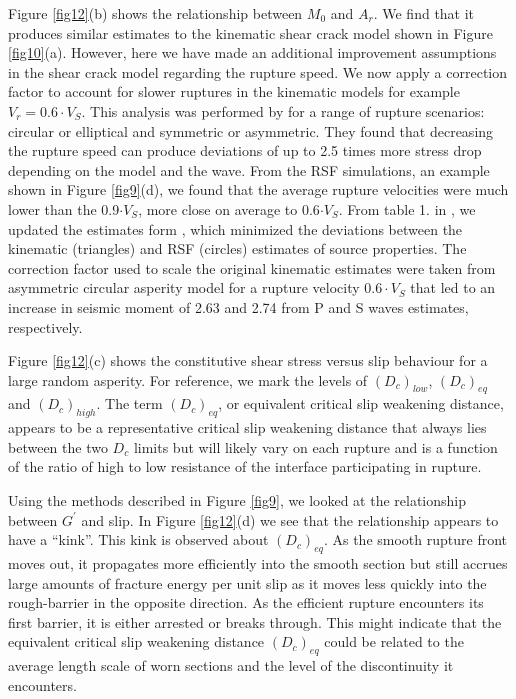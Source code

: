 \documentclass[draft]{agujournal2019}
\begin{document}
Figure \ref{fig12}(b) shows the relationship between $M_{0}$ and $A_{r}$. We find that it produces similar estimates to the kinematic shear crack model shown in Figure \ref{fig10}(a). However, here we have made an additional improvement assumptions in the shear crack model regarding the rupture speed.  We now apply a correction factor to account for slower ruptures in the kinematic models for example $V_{r} = 0.6\cdot V_{S}$.  This analysis was performed by  for a range of rupture scenarios: circular or elliptical and symmetric or asymmetric.  They found that decreasing the rupture speed can produce deviations of up to 2.5 times more stress drop depending on the model and the wave.  From the RSF simulations, an example shown in Figure \ref{fig9}(d), we found that the average rupture velocities were much lower than the 0.9$\cdot V_{S}$, more close on average to 0.6$\cdot V_{S}$.  From table 1. in , we updated the estimates form , which minimized the deviations between the kinematic (triangles) and RSF (circles) estimates of source properties.  The correction factor used to scale the original kinematic estimates were taken from asymmetric circular asperity model for a rupture velocity $0.6\cdot V_{S}$ that led to an increase in seismic moment of 2.63 and 2.74 from P and S waves estimates, respectively.

Figure \ref{fig12}(c) shows the constitutive shear stress versus slip behaviour for a large random asperity. For reference, we mark the levels of $(D_{c})_{low}$, $(D_{c})_{eq}$ and $(D_{c})_{high}$.  The term $(D_{c})_{eq}$, or equivalent critical slip weakening distance, appears to be a representative critical slip weakening distance that always lies between the two $D_{c}$ limits but will likely vary on each rupture and is a function of the ratio of high to low resistance of the interface participating in rupture.  

Using the methods described in Figure \ref{fig9}, we looked at the relationship between $G^{'}$ and slip. In Figure \ref{fig12}(d) we see that the relationship appears to have a ``kink''.  This kink is observed about $(D_{c})_{eq}$. As the smooth rupture front moves out, it propagates more efficiently into the smooth section but still accrues large amounts of fracture energy per unit slip as it moves less quickly into the rough-barrier in the opposite direction. As the efficient rupture encounters its first barrier, it is either arrested or breaks through. This might indicate that the equivalent critical slip weakening distance $(D_{c})_{eq}$ could be related to the average length scale of worn sections and the level of the discontinuity it encounters.  
\end{document}
